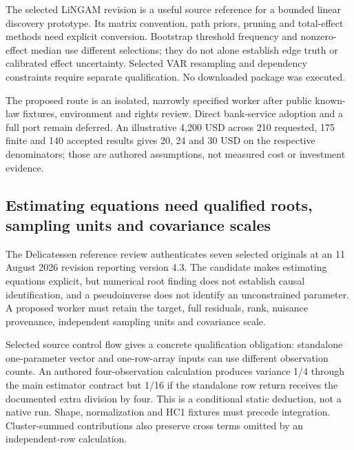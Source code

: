 The selected LiNGAM revision is a useful source reference for a bounded
linear discovery prototype. Its matrix convention, path priors, pruning
and total-effect methods need explicit conversion. Bootstrap threshold
frequency and nonzero-effect median use different selections; they do
not alone establish edge truth or calibrated effect uncertainty.
Selected VAR resampling and dependency constraints require separate
qualification. No downloaded package was executed.
\citep{exec24_lingam_source,exec24_lingam_choice}

The proposed route is an isolated, narrowly specified worker after
public known-law fixtures, environment and rights review. Direct
bank-service adoption and a full port remain deferred. An illustrative
4,200 USD across 210 requested, 175 finite and 140 accepted results
gives 20, 24 and 30 USD on the respective denominators; those are
authored assumptions, not measured cost or investment
evidence.\citep{exec24_lingam_choice}

\hypertarget{estimating-equations-need-qualified-roots-sampling-units-and-covariance-scales}{%
\subsection{Estimating equations need qualified roots, sampling units
and covariance
scales}\label{estimating-equations-need-qualified-roots-sampling-units-and-covariance-scales}}

The Delicatessen reference review authenticates seven selected originals
at an 11 August 2026 revision reporting version 4.3. The candidate makes
estimating equations explicit, but numerical root finding does not
establish causal identification, and a pseudoinverse does not identify
an unconstrained parameter. A proposed worker must retain the target,
full residuals, rank, nuisance provenance, independent sampling units
and covariance scale.
\citep{exec24_delicatessen_source,exec24_delicatessen_choice}

Selected source control flow gives a concrete qualification obligation:
standalone one-parameter vector and one-row-array inputs can use
different observation counts. An authored four-observation calculation
produces variance 1/4 through the main estimator contract but 1/16 if
the standalone row return receives the documented extra division by
four. This is a conditional static deduction, not a native run. Shape,
normalization and HC1 fixtures must precede integration. Cluster-summed
contributions also preserve cross terms omitted by an independent-row
calculation.
\citep{exec24_delicatessen_source,exec24_delicatessen_choice}

